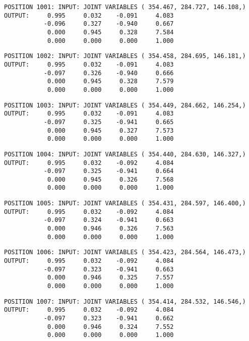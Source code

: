 \begin{verbatim}
POSITION 1001: INPUT: JOINT VARIABLES ( 354.467, 284.727, 146.108,)
OUTPUT:     0.995     0.032    -0.091     4.083
           -0.096     0.327    -0.940     0.667
            0.000     0.945     0.328     7.584
            0.000     0.000     0.000     1.000
\end{verbatim} \pagebreak[1]\begin{verbatim}
POSITION 1002: INPUT: JOINT VARIABLES ( 354.458, 284.695, 146.181,)
OUTPUT:     0.995     0.032    -0.091     4.083
           -0.097     0.326    -0.940     0.666
            0.000     0.945     0.328     7.579
            0.000     0.000     0.000     1.000
\end{verbatim} \pagebreak[1]\begin{verbatim}
POSITION 1003: INPUT: JOINT VARIABLES ( 354.449, 284.662, 146.254,)
OUTPUT:     0.995     0.032    -0.091     4.083
           -0.097     0.325    -0.941     0.665
            0.000     0.945     0.327     7.573
            0.000     0.000     0.000     1.000
\end{verbatim} \pagebreak[1]\begin{verbatim}
POSITION 1004: INPUT: JOINT VARIABLES ( 354.440, 284.630, 146.327,)
OUTPUT:     0.995     0.032    -0.092     4.084
           -0.097     0.325    -0.941     0.664
            0.000     0.945     0.326     7.568
            0.000     0.000     0.000     1.000
\end{verbatim} \pagebreak[1]\begin{verbatim}
POSITION 1005: INPUT: JOINT VARIABLES ( 354.431, 284.597, 146.400,)
OUTPUT:     0.995     0.032    -0.092     4.084
           -0.097     0.324    -0.941     0.663
            0.000     0.946     0.326     7.563
            0.000     0.000     0.000     1.000
\end{verbatim} \pagebreak[1]\begin{verbatim}
POSITION 1006: INPUT: JOINT VARIABLES ( 354.423, 284.564, 146.473,)
OUTPUT:     0.995     0.032    -0.092     4.084
           -0.097     0.323    -0.941     0.663
            0.000     0.946     0.325     7.557
            0.000     0.000     0.000     1.000
\end{verbatim} \pagebreak[1]\begin{verbatim}
POSITION 1007: INPUT: JOINT VARIABLES ( 354.414, 284.532, 146.546,)
OUTPUT:     0.995     0.032    -0.092     4.084
           -0.097     0.323    -0.941     0.662
            0.000     0.946     0.324     7.552
            0.000     0.000     0.000     1.000
\end{verbatim} \pagebreak[1]\begin{verbatim}

\end{verbatim}

